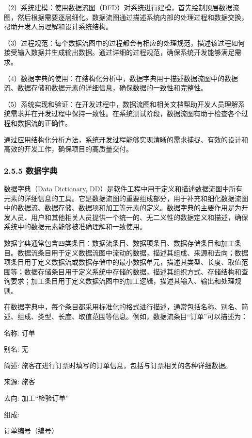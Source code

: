 （2）系统建模：使用数据流图（DFD）对系统进行建模，首先绘制顶层数据流图，然后根据需要逐层细化。数据流图通过描述系统内部的处理过程和数据交换，帮助开发人员理解和设计系统结构。

（3）过程规范：每个数据流图中的过程都会有相应的处理规范，描述该过程如何接受输入数据并生成输出数据。通过详细的过程规范，确保系统开发能够满足需求。

（4）数据字典的使用：在结构化分析中，数据字典用于描述数据流图中的数据流、数据存储和数据元素的详细信息，确保数据的一致性和完整性。

（5）系统实现和验证：在开发过程中，数据流图和相关文档帮助开发人员理解系统需求并在开发过程中保持一致性。在系统测试阶段，数据流图有助于检查各个过程和数据流的正确性。

通过应用结构化分析方法，系统开发过程能够实现清晰的需求捕捉、有效的设计和高效的开发工作，确保项目的高质量交付。

\hypertarget{ux6570ux636eux5b57ux5178}{%
\subsubsection{2.5.5 数据字典}\label{ux6570ux636eux5b57ux5178}}

数据字典（Data Dictionary, DD）是软件工程中用于定义和描述数据流图中所有元素的详细信息的工具。它是数据流图的重要组成部分，用于补充和细化数据流图中的数据流、数据存储、数据项和加工等元素的定义。数据字典的主要作用是为开发人员、用户和其他相关人员提供一个统一的、无二义性的数据定义和描述，确保系统中的数据元素能够被准确理解和一致使用。

数据字典通常包含四类条目：数据流条目、数据项条目、数据存储条目和加工条目。数据流条目用于定义数据流图中流动的数据，描述其组成、来源和去向；数据项条目用于定义数据流或数据存储中的最小数据单元，描述其类型、长度、取值范围等；数据存储条目用于定义系统中存储的数据，描述其组织方式、存储结构和查询要求；加工条目用于定义数据流图中的加工逻辑，描述其输入、输出和处理规则。

在数据字典中，每个条目都采用标准化的格式进行描述，通常包括名称、别名、简述、组成、类型、长度、取值范围等信息。例如，数据流条目``订单''可以描述为：

名称: 订单

别名: 无

简述: 旅客在进行订票时填写的订单信息，包括与订票相关的各种详细数据。

来源: 旅客

去向: 加工``检验订单''

组成:

订单编号（编号）

